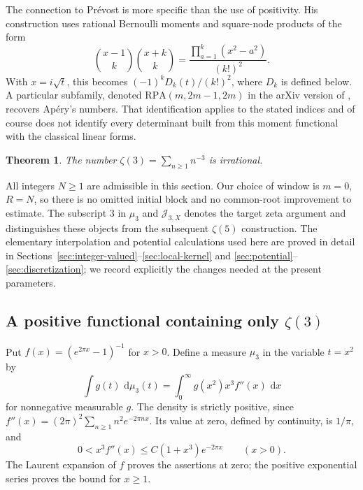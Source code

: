 \documentclass[11pt,letterpaper]{article}
\newtheorem{theorem}{Theorem}[section]
\theoremstyle{definition}
\newcommand{\dd}{\,\mathrm d}
\begin{document}
The connection to Pr\'evost is more specific than the use of positivity.
His construction uses rational Bernoulli moments and square-node products
of the form
\[
 \binom{x-1}{k}\binom{x+k}{k}
 =\frac{\prod_{a=1}^{k}(x^2-a^2)}{(k!)^2}.
\]
With $x=i\sqrt t$, this becomes $(-1)^kD_k(t)/(k!)^2$, where $D_k$
is defined below. A particular subfamily, denoted
$\mathrm{RPA}(m,2m-1,2m)$ in the arXiv version of \cite[Section~5.2]{prevost2019},
recovers Ap\'ery's numbers. That identification applies to the stated
indices and of course does not identify every determinant built from this moment
functional with the classical linear forms.

\begin{theorem}\label{thm:z3-warmup}
The number $\zeta(3)=\sum_{n\ge1}n^{-3}$ is irrational.
\end{theorem}

All integers $N\ge1$ are admissible in this section. Our choice of window
is $m=0$, $R=N$, so there is no omitted initial block and no common-root
improvement to estimate. The subscript $3$ in $\mu_3$ and
$\mathcal J_{3,X}$ denotes the target zeta argument and distinguishes
these objects from the subsequent $\zeta(5)$ construction. The elementary
interpolation and potential calculations used here are proved in detail
in Sections~\ref{sec:integer-valued}--\ref{sec:local-kernel} and
\ref{sec:potential}--\ref{sec:discretization}; we record explicitly the
changes needed at the present parameters.

\subsection{A positive functional containing only \texorpdfstring{$\zeta(3)$}{zeta(3)}}

Put $f(x)=(e^{2\pi x}-1)^{-1}$ for $x>0$. Define a measure $\mu_3$ in
the variable $t=x^2$ by
\begin{equation}\label{eq:z3-measure}
 \int g(t)\,\dd\mu_3(t)
 =\int_0^\infty g(x^2)x^3 f''(x)\,\dd x
\end{equation}
for nonnegative measurable $g$. The density is strictly positive, since
$f''(x)=(2\pi)^2\sum_{n\ge1}n^2e^{-2\pi nx}$. Its value at zero,
defined by continuity, is $1/\pi$, and
\begin{equation}\label{eq:z3-density-bound}
 0<x^3f''(x)\le C(1+x^3)e^{-2\pi x}\qquad(x>0).
\end{equation}
The Laurent expansion of $f$ proves the assertions at zero; the positive
exponential series proves the bound for $x\ge1$.
\end{document}
